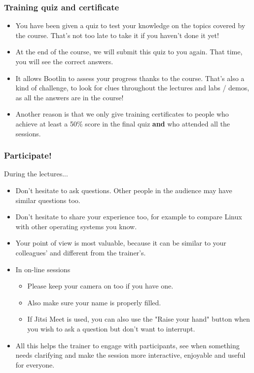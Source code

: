 \begin{frame}
\frametitle{Training quiz and certificate}
\begin{itemize}
\item You have been given a quiz to test your knowledge
      on the topics covered by the course.
      That's not too late to take it if you haven't done it yet!
\item At the end of the course, we will submit this quiz
      to you again. That time, you will see the correct answers.
\item It allows Bootlin to assess your progress thanks to the course.
      That's also a kind of challenge, to look for clues throughout
      the lectures and labs / demos, as all the answers are in the course!
\item Another reason is that we only give training certificates
      to people who achieve at least a 50\% score in the final quiz
      {\bf and} who attended all the sessions.
\end{itemize}
\end{frame}

\begin{frame}

\frametitle{Participate!}
During the lectures...
\begin{itemize}
\item Don't hesitate to ask questions. Other people in the audience may have
similar questions too.
\item Don't hesitate to share your experience too, for example to compare Linux
with other operating systems you know.
\item Your point of view is most valuable, because it can be similar to your
colleagues' and different from the trainer's.
\item In on-line sessions
   \begin{itemize}
   \item Please keep your camera on too if you have one.
   \item Also make sure your name is properly filled.
   \item If Jitsi Meet is used, you can also use the "Raise your hand"
         button when you wish to ask a question but don't want to
	 interrupt.
   \end{itemize}
\item All this helps the trainer to engage with participants, see when
something needs clarifying and make the session more interactive, enjoyable
and useful for everyone.
\end{itemize}
\end{frame}

